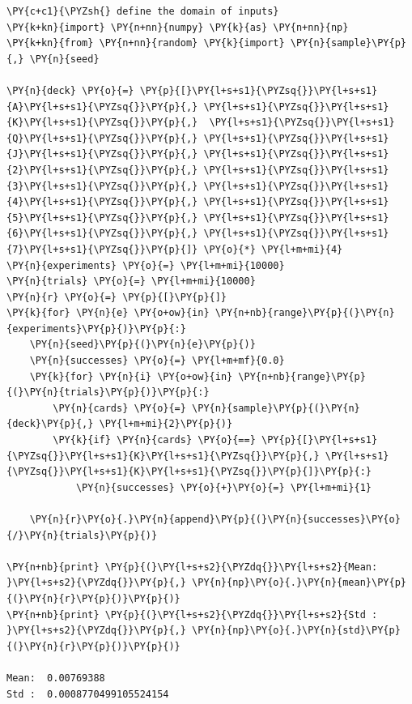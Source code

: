 \begin{codebox}
\begin{Verbatim}[commandchars=\\\{\}]
\PY{c+c1}{\PYZsh{} define the domain of inputs}
\PY{k+kn}{import} \PY{n+nn}{numpy} \PY{k}{as} \PY{n+nn}{np}
\PY{k+kn}{from} \PY{n+nn}{random} \PY{k}{import} \PY{n}{sample}\PY{p}{,} \PY{n}{seed}
	
\PY{n}{deck} \PY{o}{=} \PY{p}{[}\PY{l+s+s1}{\PYZsq{}}\PY{l+s+s1}{A}\PY{l+s+s1}{\PYZsq{}}\PY{p}{,} \PY{l+s+s1}{\PYZsq{}}\PY{l+s+s1}{K}\PY{l+s+s1}{\PYZsq{}}\PY{p}{,}  \PY{l+s+s1}{\PYZsq{}}\PY{l+s+s1}{Q}\PY{l+s+s1}{\PYZsq{}}\PY{p}{,} \PY{l+s+s1}{\PYZsq{}}\PY{l+s+s1}{J}\PY{l+s+s1}{\PYZsq{}}\PY{p}{,} \PY{l+s+s1}{\PYZsq{}}\PY{l+s+s1}{2}\PY{l+s+s1}{\PYZsq{}}\PY{p}{,} \PY{l+s+s1}{\PYZsq{}}\PY{l+s+s1}{3}\PY{l+s+s1}{\PYZsq{}}\PY{p}{,} \PY{l+s+s1}{\PYZsq{}}\PY{l+s+s1}{4}\PY{l+s+s1}{\PYZsq{}}\PY{p}{,} \PY{l+s+s1}{\PYZsq{}}\PY{l+s+s1}{5}\PY{l+s+s1}{\PYZsq{}}\PY{p}{,} \PY{l+s+s1}{\PYZsq{}}\PY{l+s+s1}{6}\PY{l+s+s1}{\PYZsq{}}\PY{p}{,} \PY{l+s+s1}{\PYZsq{}}\PY{l+s+s1}{7}\PY{l+s+s1}{\PYZsq{}}\PY{p}{]} \PY{o}{*} \PY{l+m+mi}{4}
\PY{n}{experiments} \PY{o}{=} \PY{l+m+mi}{10000}
\PY{n}{trials} \PY{o}{=} \PY{l+m+mi}{10000}
\PY{n}{r} \PY{o}{=} \PY{p}{[}\PY{p}{]}
\PY{k}{for} \PY{n}{e} \PY{o+ow}{in} \PY{n+nb}{range}\PY{p}{(}\PY{n}{experiments}\PY{p}{)}\PY{p}{:}
    \PY{n}{seed}\PY{p}{(}\PY{n}{e}\PY{p}{)}
    \PY{n}{successes} \PY{o}{=} \PY{l+m+mf}{0.0}
    \PY{k}{for} \PY{n}{i} \PY{o+ow}{in} \PY{n+nb}{range}\PY{p}{(}\PY{n}{trials}\PY{p}{)}\PY{p}{:}
        \PY{n}{cards} \PY{o}{=} \PY{n}{sample}\PY{p}{(}\PY{n}{deck}\PY{p}{,} \PY{l+m+mi}{2}\PY{p}{)}
        \PY{k}{if} \PY{n}{cards} \PY{o}{==} \PY{p}{[}\PY{l+s+s1}{\PYZsq{}}\PY{l+s+s1}{K}\PY{l+s+s1}{\PYZsq{}}\PY{p}{,} \PY{l+s+s1}{\PYZsq{}}\PY{l+s+s1}{K}\PY{l+s+s1}{\PYZsq{}}\PY{p}{]}\PY{p}{:}
            \PY{n}{successes} \PY{o}{+}\PY{o}{=} \PY{l+m+mi}{1}
	
    \PY{n}{r}\PY{o}{.}\PY{n}{append}\PY{p}{(}\PY{n}{successes}\PY{o}{/}\PY{n}{trials}\PY{p}{)}
	
\PY{n+nb}{print} \PY{p}{(}\PY{l+s+s2}{\PYZdq{}}\PY{l+s+s2}{Mean: }\PY{l+s+s2}{\PYZdq{}}\PY{p}{,} \PY{n}{np}\PY{o}{.}\PY{n}{mean}\PY{p}{(}\PY{n}{r}\PY{p}{)}\PY{p}{)}
\PY{n+nb}{print} \PY{p}{(}\PY{l+s+s2}{\PYZdq{}}\PY{l+s+s2}{Std : }\PY{l+s+s2}{\PYZdq{}}\PY{p}{,} \PY{n}{np}\PY{o}{.}\PY{n}{std}\PY{p}{(}\PY{n}{r}\PY{p}{)}\PY{p}{)}

Mean:  0.00769388
Std :  0.0008770499105524154
\end{Verbatim}
\end{codebox}

